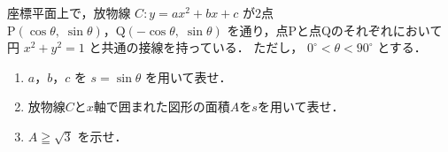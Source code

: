 ﻿\documentclass[../../../uem_mat_tok_q.tex]{subfiles}
\begin{document}
    座標平面上で，放物線 $C\colon y=ax^2+bx+c$ が2点\\
    $\mathrm{P}(\cos\theta,\;\sin\theta)$，$\mathrm{Q}(-\cos\theta,\;\sin\theta)$%
    を通り，点Pと点Qのそれぞれにおいて円 $x^2+y^2=1$ と共通の接線を持っている．%
    ただし， $0^\circ<\theta<90^\circ$ とする．

    \begin{enumerate}
        \item $a$，$b$，$c$ を $s=\sin\theta$ を用いて表せ．
        \item 放物線$C$と$x$軸で囲まれた図形の面積$A$を$s$を用いて表せ．
        \item $A\geqq\sqrt{3}$ を示せ．
    \end{enumerate}
\end{document}
